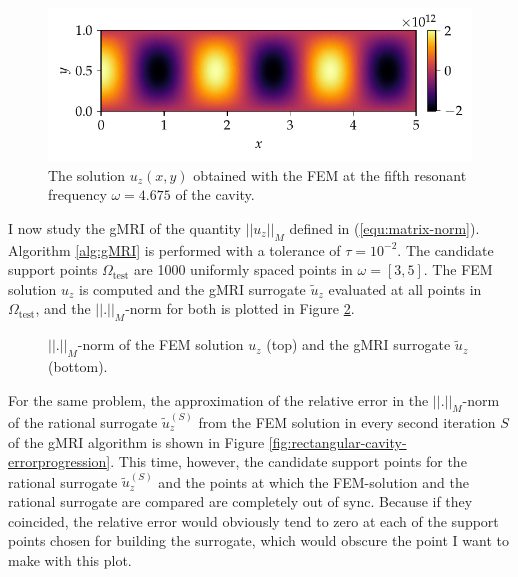 \documentclass[11pt, a4paper]{article}
\begin{document}
\begin{figure}[ht]
    \includegraphics{plots/rectangular_cavity_mode5.pdf}
    \caption{The solution $u_z(x, y)$ obtained with the \acrshort{FEM} at the
    fifth resonant frequency $\omega = 4.675$ of the cavity.}
    \label{fig:rectangular-cavity-mode5}
\end{figure}

I now study the \acrshort{gMRI} of the quantity $||u_z||_M$ defined in
(\ref{equ:matrix-norm}). Algorithm \ref{alg:gMRI} is performed
with a tolerance of $\tau = 10^{-2}$. The candidate support points $\Omega_{\mathrm{test}}$
are 1000 uniformly spaced points in $\omega = [3, 5]$. The \acrshort{FEM} solution $u_z$
is computed and the \acrshort{gMRI} surrogate $\tilde{u}_z$ evaluated at all points in $\Omega_{\mathrm{test}}$,
and the $||.||_M$-norm for both is plotted in Figure \ref{fig:rectangular-cavity-norms}. 

\begin{figure}[ht]
    \centering
    
    \caption{$||.||_M$-norm of the \acrshort{FEM} solution $u_z$ (top) and the 
    \acrshort{gMRI} surrogate $\tilde{u}_z$ (bottom).}
    \label{fig:rectangular-cavity-norms}
\end{figure}

For the same problem, the approximation of the relative error 
in the $||.||_M$-norm of the rational surrogate $\tilde{u}_z^{(S)}$ from the
\acrshort{FEM} solution in every second iteration $S$ of the \acrshort{gMRI} algorithm
is shown in Figure \ref{fig:rectangular-cavity-errorprogression}. This time,
however, the candidate support points for the rational surrogate $\tilde{u}_z^{(S)}$
and the points at which the \acrshort{FEM}-solution and the rational surrogate
are compared are completely out of sync. Because if they coincided, the relative error
would obviously tend to zero at each of the support points chosen for building
the surrogate, which would obscure the point I want to make with this plot.
\end{document}
